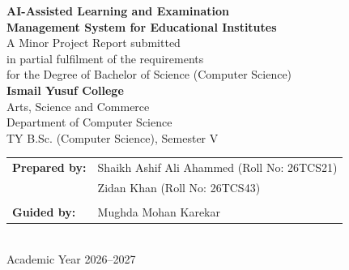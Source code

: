 \begin{titlepage}
\thispagestyle{empty}
\begin{center}
\vspace*{2.0cm}
{\LARGE\bfseries AI-Assisted Learning and Examination\\[0.4em]
Management System for Educational Institutes}\\[2.2cm]

{\large A Minor Project Report submitted\\[0.3em]
in partial fulfilment of the requirements\\[0.3em]
for the Degree of Bachelor of Science (Computer Science)}\\[2.2cm]

{\large\textbf{Ismail Yusuf College}\\[0.2em]
Arts, Science and Commerce\\[0.2em]
Department of Computer Science\\[0.4em]
TY B.Sc. (Computer Science), Semester V}\\[2.6cm]

\begin{tabular}{ll}
\textbf{Prepared by:} & Shaikh Ashif Ali Ahammed \quad (Roll No: 26TCS21) \\
                      & Zidan Khan \quad (Roll No: 26TCS43) \\
\\[0.6em]
\textbf{Guided by:}    & Mughda Mohan Karekar \\
\end{tabular}
\\[2.2cm]

{\large Academic Year 2026--2027}
\end{center}
\end{titlepage}